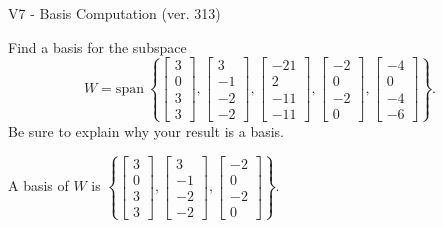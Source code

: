 \begin{exercise}
  \begin{exerciseTitle}V7 - Basis Computation (ver. 313)\end{exerciseTitle}
  \begin{exerciseStatement}
    Find a basis for the subspace 
\[W=\mathrm{span}\ \left\{\left[\begin{array}{r}
3 \\
0 \\
3 \\
3
\end{array}\right] , \left[\begin{array}{r}
3 \\
-1 \\
-2 \\
-2
\end{array}\right] , \left[\begin{array}{r}
-21 \\
2 \\
-11 \\
-11
\end{array}\right] , \left[\begin{array}{r}
-2 \\
0 \\
-2 \\
0
\end{array}\right] , \left[\begin{array}{r}
-4 \\
0 \\
-4 \\
-6
\end{array}\right]\right\}.\]
 Be sure to explain why your result is a basis.


  \end{exerciseStatement}
  \begin{exerciseAnswer}
   A basis of \(W\) is  \(\left\{\left[\begin{array}{r}
3 \\
0 \\
3 \\
3
\end{array}\right] , \left[\begin{array}{r}
3 \\
-1 \\
-2 \\
-2
\end{array}\right] , \left[\begin{array}{r}
-2 \\
0 \\
-2 \\
0
\end{array}\right]\right\}\).
  


  \end{exerciseAnswer}
\end{exercise}